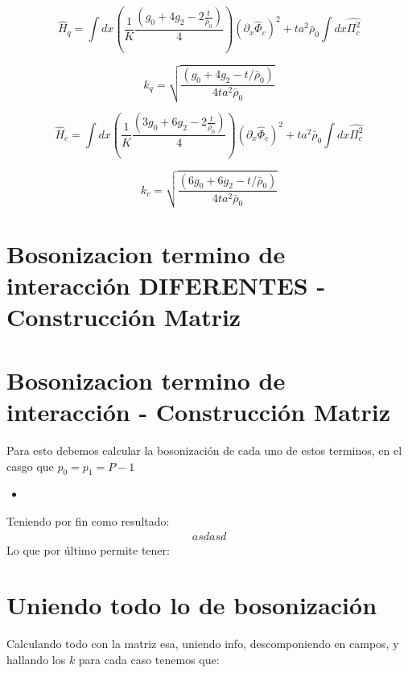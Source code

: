 \begin{enumerate}
\begin{equation}
    \hat{H}_{q} = \int dx \left( \frac{1}{K} \frac{(g_{0}+4g_{2} - 2 \frac{t}{\bar{\rho}_{0}})}{4} \right) (\partial_{x}\hat{\Phi}_c)^{2}    +t a^2 \bar{\rho}_{0} \int dx \hat{\Pi_{c}^{2}}
\end{equation}

\begin{equation}
    k_{q} = \sqrt{\frac{(g_{0} +4g_{2}-t/\bar{\rho}_{0})}{4ta^2 \bar{\rho}_{0}}}
\end{equation}


\begin{equation}
    \hat{H}_{c} = \int dx \left( \frac{1}{K} \frac{(3g_{0}+6g_{2} - 2 \frac{t}{\bar{\rho}_{0}})}{4} \right) (\partial_{x}\hat{\Phi}_c)^{2}    +t a^2 \bar{\rho}_{0} \int dx \hat{\Pi_{c}^{2}}
\end{equation}

\begin{equation}
    k_{c} = \sqrt{\frac{(6g_{0} +6g_{2}-t/\bar{\rho}_{0})}{4ta^2 \bar{\rho}_{0}}}
\end{equation}


\end{enumerate}

\section{\textbf{Bosonizacion termino de interacción DIFERENTES - Construcción Matriz}}



\section{\textbf{Bosonizacion termino de interacción - Construcción Matriz}}
Para esto debemos calcular la bosonización de cada uno de estos terminos, en el casgo que $p_0=p_1=P-1$
\begin{itemize}
    \item 
\end{itemize}
Teniendo por fin como resultado:
\begin{align}
    asdasd
\end{align}
Lo que por último permite tener:


\section{Uniendo todo lo de bosonización}
Calculando todo con la matriz esa, uniendo info, descomponiendo en campos, y hallando los $k$ para cada caso tenemos que:

